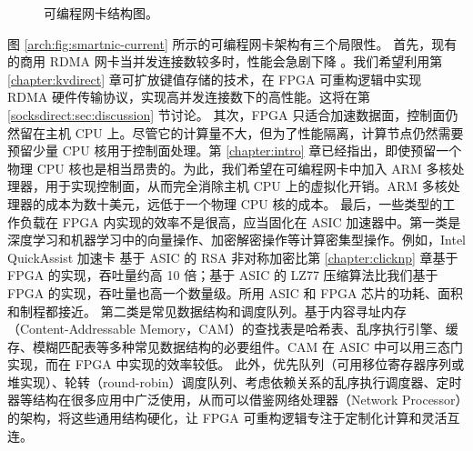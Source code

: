 \begin{figure}[htbp]
	\centering
	\hspace{0.05\textwidth}
	\caption{可编程网卡结构图。}
\end{figure}


图 \ref{arch:fig:smartnic-current} 所示的可编程网卡架构有三个局限性。
首先，现有的商用 RDMA 网卡当并发连接数较多时，性能会急剧下降 \cite{mprdma}。我们希望利用第 \ref{chapter:kvdirect} 章可扩放键值存储的技术，在 FPGA 可重构逻辑中实现 RDMA 硬件传输协议，实现高并发连接数下的高性能。这将在第 \ref{socksdirect:sec:discussion} 节讨论。
其次，FPGA 只适合加速数据面，控制面仍然留在主机 CPU 上。尽管它的计算量不大，但为了性能隔离，计算节点仍然需要预留少量 CPU 核用于控制面处理。第 \ref{chapter:intro} 章已经指出，即使预留一个物理 CPU 核也是相当昂贵的。为此，我们希望在可编程网卡中加入 ARM 多核处理器，用于实现控制面，从而完全消除主机 CPU 上的虚拟化开销。ARM 多核处理器的成本为数十美元，远低于一个物理 CPU 核的成本。
最后，一些类型的工作负载在 FPGA 内实现的效率不是很高，应当固化在 ASIC 加速器中。第一类是深度学习和机器学习中的向量操作、加密解密操作等计算密集型操作。例如，Intel QuickAssist 加速卡 \cite{intel-qat} 基于 ASIC 的 RSA 非对称加密比第 \ref{chapter:clicknp} 章基于 FPGA 的实现，吞吐量约高 10 倍；基于 ASIC 的 LZ77 压缩算法比我们基于 FPGA 的实现，吞吐量也高一个数量级。所用 ASIC 和 FPGA 芯片的功耗、面积和制程都接近。
第二类是常见数据结构和调度队列。基于内容寻址内存（Content-Addressable Memory，CAM）的查找表是哈希表、乱序执行引擎、缓存、模糊匹配表等多种常见数据结构的必要组件。CAM 在 ASIC 中可以用三态门实现，而在 FPGA 中实现的效率较低。
此外，优先队列（可用移位寄存器序列或堆实现）、轮转（round-robin）调度队列、考虑依赖关系的乱序执行调度器、定时器等结构在很多应用中广泛使用，从而可以借鉴网络处理器（Network Processor）的架构，将这些通用结构硬化，让 FPGA 可重构逻辑专注于定制化计算和灵活互连。

